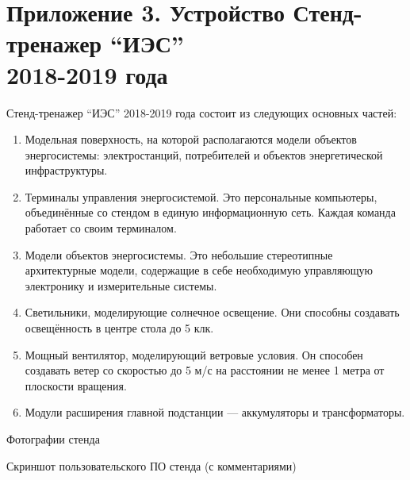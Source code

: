 \section*{Приложение 3. Устройство Стенд-тренажер “ИЭС” \\ 
2018-2019 года}

Стенд-тренажер “ИЭС” 2018-2019 года состоит из следующих основных частей:

\begin{enumerate}
    \item Модельная поверхность, на которой располагаются модели объектов энергосистемы: электростанций, потребителей и объектов энергетической инфраструктуры.
    \item Терминалы управления энергосистемой. Это персональные компьютеры, объединённые со стендом в единую информационную сеть. Каждая команда работает со своим терминалом.
    \item Модели объектов энергосистемы. Это небольшие стереотипные архитектурные модели, содержащие в себе необходимую управляющую электронику и измерительные системы.
    \item Светильники, моделирующие солнечное освещение. Они способны создавать освещённость в центре стола до 5 клк.
    \item Мощный вентилятор, моделирующий ветровые условия. Он способен создавать ветер со скоростью до 5 м/с на расстоянии не менее 1 метра от плоскости вращения.
    \item Модули расширения главной подстанции — аккумуляторы и трансформаторы.        
\end{enumerate}


\center Фотографии стенда


\center Скриншот пользовательского ПО стенда (с комментариями)

